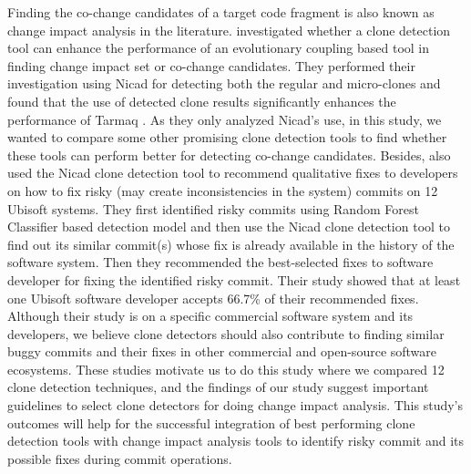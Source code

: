 \documentclass[review]{elsarticle}
\begin{document}
Finding the co-change candidates of a target code fragment is also known as change impact analysis \cite{book-change-impact} in the literature.  \citet{Mondal:Association:Rules} investigated whether a clone detection tool can enhance the performance of an evolutionary coupling based tool in finding change impact set or co-change candidates. They performed their investigation using Nicad for detecting both the regular and micro-clones and found that the use of detected clone results significantly enhances the performance of Tarmaq \cite{TarmaqChangeImpact}. As they only analyzed Nicad's use, in this study, we wanted to compare some other promising clone detection tools to find whether these tools can perform better for detecting co-change candidates. Besides, \citet{CLEVER-JIT} also used the Nicad clone detection tool to recommend qualitative fixes to developers on how to fix risky (may create inconsistencies in the system) commits on 12 Ubisoft systems. They first identified risky commits using Random Forest Classifier \cite{RandomForestAlgo} based detection model and then use the Nicad clone detection tool to find out its similar commit(s) whose fix is already available in the history of the software system. Then they recommended the best-selected fixes to software developer for fixing the identified risky commit. Their study showed that at least one Ubisoft software developer accepts 66.7\% of their recommended fixes. Although their study is on a specific commercial software system and its developers, we believe clone detectors should also contribute to finding similar buggy commits and their fixes in other commercial and open-source software ecosystems. These studies motivate us to do this study where we compared 12 clone detection techniques, and the findings of our study suggest important guidelines to select clone detectors for doing change impact analysis. This study's outcomes will help for the successful integration of best performing clone detection tools with change impact analysis tools to identify risky commit and its possible fixes during commit operations.   
\end{document}
